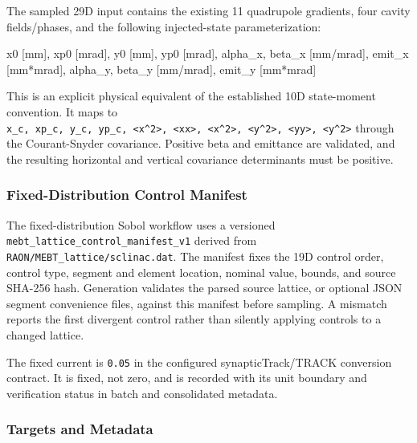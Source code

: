 \documentclass[
]{article}
\newenvironment{Shaded}{}{}
\newcommand{\NormalTok}[1]{#1}
\begin{document}
The sampled 29D input contains the existing 11 quadrupole gradients,
four cavity fields/phases, and the following injected-state
parameterization:

\begin{Shaded}
\begin{Highlighting}[]
\NormalTok{x0 [mm], xp0 [mrad], y0 [mm], yp0 [mrad],}
\NormalTok{alpha\_x, beta\_x [mm/mrad], emit\_x [mm*mrad],}
\NormalTok{alpha\_y, beta\_y [mm/mrad], emit\_y [mm*mrad]}
\end{Highlighting}
\end{Shaded}

This is an explicit physical equivalent of the established 10D
state-moment convention. It maps to
\texttt{x\_c,\ xp\_c,\ y\_c,\ yp\_c,\ \textless{}x\^{}2\textgreater{},\ \textless{}xx\textquotesingle{}\textgreater{},\ \textless{}x\textquotesingle{}\^{}2\textgreater{},\ \textless{}y\^{}2\textgreater{},\ \textless{}yy\textquotesingle{}\textgreater{},\ \textless{}y\textquotesingle{}\^{}2\textgreater{}}
through the Courant-Snyder covariance. Positive beta and emittance are
validated, and the resulting horizontal and vertical covariance
determinants must be positive.

\hypertarget{fixed-distribution-control-manifest}{%
\subsubsection{Fixed-Distribution Control
Manifest}\label{fixed-distribution-control-manifest}}

The fixed-distribution Sobol workflow uses a versioned
\texttt{mebt\_lattice\_control\_manifest\_v1} derived from
\texttt{RAON/MEBT\_lattice/sclinac.dat}. The manifest fixes the 19D
control order, control type, segment and element location, nominal
value, bounds, and source SHA-256 hash. Generation validates the parsed
source lattice, or optional JSON segment convenience files, against this
manifest before sampling. A mismatch reports the first divergent control
rather than silently applying controls to a changed lattice.

The fixed current is \texttt{0.05} in the configured synapticTrack/TRACK
conversion contract. It is fixed, not zero, and is recorded with its
unit boundary and verification status in batch and consolidated
metadata.

\hypertarget{targets-and-metadata}{%
\subsubsection{Targets and Metadata}\label{targets-and-metadata}}
\end{document}
